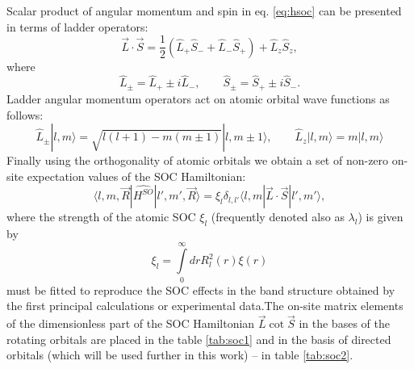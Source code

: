 Scalar product of angular momentum and spin in eq. \ref{eq:hsoc} can be presented in terms of ladder operators:
\begin{equation}
	\vec{L} \cdot \vec{S} = \frac{1}{2} (\hat{L}_{+} \hat{S}_{-} + \hat{L}_{-} \hat{S}_{+}) + \hat{L}_z \hat{S}_z,
\end{equation}
where
\begin{equation}
	\hat{L}_{\pm} = \hat{L}_{+} \pm i\hat{L}_{-},\qquad \hat{S}_{\pm} = \hat{S}_{+} \pm i\hat{S}_{-}.
\end{equation}
Ladder angular momentum operators act on atomic orbital wave functions as follows:
\begin{equation}
	\hat{L}_{\pm} |l, m \rangle = \sqrt{l(l+1) - m (m \pm 1)} |l, m \pm 1 \rangle, \qquad \hat{L}_z |l, m \rangle = m |l, m \rangle
\end{equation}
Finally using the orthogonality of atomic orbitals we obtain a set of non-zero on-site expectation values of the SOC Hamiltonian:
\begin{equation}
 	\langle l,m, \vec{R} | \hat{H^{SO}} | l', m', \vec{R} \rangle = \xi_l \delta_{l,l'} \langle l, m | \vec{L} \cdot \vec{S} | l', m' \rangle,
\end{equation} 
where the strength of the atomic SOC $\xi_l$ (frequently denoted also as $\lambda_l$) is given by 
\begin{equation}
	\xi_l = \int\limits^\infty_0 dr R^2_l(r) \xi(r)
\end{equation}
must be fitted to reproduce the SOC effects in the band structure obtained by the first principal calculations or experimental data.The on-site matrix elements of the dimensionless part of the SOC Hamiltonian $\vec{L} \cot \vec{S} $ in the bases of the rotating orbitals are placed in the table \ref{tab:soc1} and in the basis of directed orbitals (which will be used further in this work) -- in table \ref{tab:soc2}.

